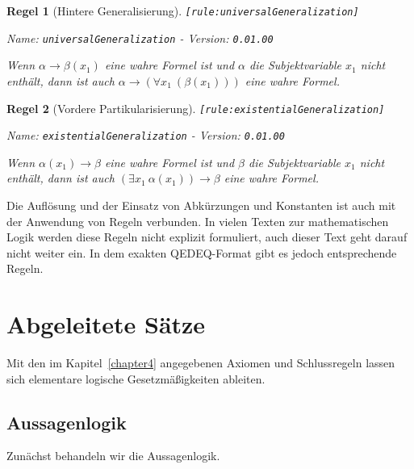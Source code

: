 \documentclass[a4paper,german,10pt,twoside]{book}
\newtheorem{rul}{Regel}
\theoremstyle{definition}
\theoremstyle{remark}
\begin{document}
\begin{rul}[Hintere Generalisierung]
\label{rule:universalGeneralization} \hypertarget{rule:universalGeneralization}{}
{\tt \tiny [\verb]rule:universalGeneralization]]}

\par
{\em   Name: \verb]universalGeneralization]  -  Version: \verb]0.01.00]}


Wenn $\alpha \rightarrow \beta(x_1)$ eine wahre Formel ist und $\alpha$ die Subjektvariable $x_1$ nicht enth{\"a}lt, dann ist auch $\alpha \rightarrow (\forall x_1~(\beta(x_1)))$ 
eine wahre Formel.
\end{rul}


\begin{rul}[Vordere Partikularisierung]
\label{rule:existentialGeneralization} \hypertarget{rule:existentialGeneralization}{}
{\tt \tiny [\verb]rule:existentialGeneralization]]}

\par
{\em   Name: \verb]existentialGeneralization]  -  Version: \verb]0.01.00]}


Wenn $\alpha(x_1) \rightarrow \beta$ eine wahre Formel ist und $\beta$ die Subjektvariable $x_1$ nicht enth{\"a}lt, dann ist auch $(\exists x_1~\alpha(x_1)) \rightarrow \beta$ eine wahre Formel.
\end{rul}


Die Aufl{\"o}sung und der Einsatz von Abk{\"u}rzungen und Konstanten ist auch mit der Anwendung von Regeln verbunden. In vielen Texten zur mathematischen Logik werden diese Regeln nicht explizit formuliert, auch dieser Text geht darauf nicht weiter ein. In dem exakten QEDEQ-Format gibt es jedoch entsprechende Regeln.




\chapter{Abgeleitete S{\"a}tze} \label{chapter6} \hypertarget{chapter6}{}

Mit den im Kapitel~\ref{chapter4} angegebenen Axiomen und Schlussregeln lassen sich elementare logische Gesetzm{\"a}{\ss}igkeiten ableiten.

\section{Aussagenlogik} \label{chapter6_section1} \hypertarget{chapter6_section1}{}
Zun{\"a}chst behandeln wir die Aussagenlogik.
\end{document}
